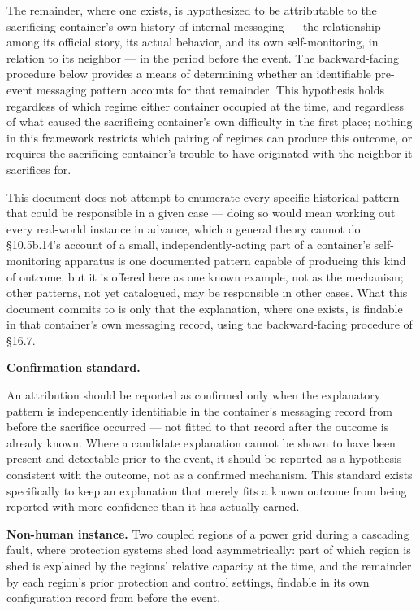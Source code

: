 \documentclass[
]{article}
\begin{document}
The remainder, where one exists, is hypothesized to be attributable to
the sacrificing container's own history of internal messaging --- the
relationship among its official story, its actual behavior, and its own
self-monitoring, in relation to its neighbor --- in the period before
the event. The backward-facing procedure below provides a means of
determining whether an identifiable pre-event messaging pattern accounts
for that remainder. This hypothesis holds regardless of which regime
either container occupied at the time, and regardless of what caused the
sacrificing container's own difficulty in the first place; nothing in
this framework restricts which pairing of regimes can produce this
outcome, or requires the sacrificing container's trouble to have
originated with the neighbor it sacrifices for.

This document does not attempt to enumerate every specific historical
pattern that could be responsible in a given case --- doing so would
mean working out every real-world instance in advance, which a general
theory cannot do. §10.5b.14's account of a small, independently-acting
part of a container's self-monitoring apparatus is one documented
pattern capable of producing this kind of outcome, but it is offered
here as one known example, not as the mechanism; other patterns, not yet
catalogued, may be responsible in other cases. What this document
commits to is only that the explanation, where one exists, is findable
in that container's own messaging record, using the backward-facing
procedure of §16.7.

\textbf{Confirmation standard.}

An attribution should be reported as confirmed only when the explanatory
pattern is independently identifiable in the container's messaging
record from before the sacrifice occurred --- not fitted to that record
after the outcome is already known. Where a candidate explanation cannot
be shown to have been present and detectable prior to the event, it
should be reported as a hypothesis consistent with the outcome, not as a
confirmed mechanism. This standard exists specifically to keep an
explanation that merely fits a known outcome from being reported with
more confidence than it has actually earned.

\textbf{Non-human instance.} Two coupled regions of a power grid during
a cascading fault, where protection systems shed load asymmetrically:
part of which region is shed is explained by the regions' relative
capacity at the time, and the remainder by each region's prior
protection and control settings, findable in its own configuration
record from before the event.
\end{document}
